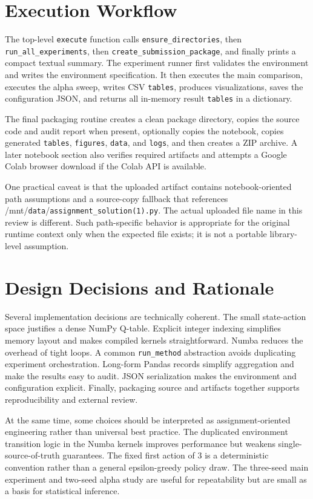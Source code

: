 \documentclass[11pt,a4paper]{article}
\begin{document}
\section{Execution Workflow}
The top-level \texttt{execute} function calls \texttt{ensure\_directories}, then \texttt{run\_all\_experiments}, then \texttt{create\_submission\_package}, and finally prints a compact textual summary. The experiment runner first validates the environment and writes the environment specification. It then executes the main comparison, executes the alpha sweep, writes CSV \texttt{tables}, produces visualizations, saves the configuration JSON, and returns all in-memory result \texttt{tables} in a dictionary.

The final packaging routine creates a clean package directory, copies the source code and audit report when present, optionally copies the notebook, copies generated \texttt{tables}, \texttt{figures}, \texttt{data}, and \texttt{logs}, and then creates a ZIP archive. A later notebook section also verifies required artifacts and attempts a Google Colab browser download if the Colab API is available.

One practical caveat is that the uploaded artifact contains notebook-oriented path assumptions and a source-copy fallback that references /mnt/\texttt{data}/\texttt{assignment\_solution(1).py}. The actual uploaded file name in this review is different. Such path-specific behavior is appropriate for the original runtime context only when the expected file exists; it is not a portable library-level assumption.

\section{Design Decisions and Rationale}
Several implementation decisions are technically coherent. The small state-action space justifies a dense NumPy Q-table. Explicit integer indexing simplifies memory layout and makes compiled kernels straightforward. Numba reduces the overhead of tight loops. A common \texttt{run\_method} abstraction avoids duplicating experiment orchestration. Long-form Pandas records simplify aggregation and make the results easy to audit. JSON serialization makes the environment and configuration explicit. Finally, packaging source and artifacts together supports reproducibility and external review.

At the same time, some choices should be interpreted as assignment-oriented engineering rather than universal best practice. The duplicated environment transition logic in the Numba kernels improves performance but weakens single-source-of-truth guarantees. The fixed first action of 3 is a deterministic convention rather than a general epsilon-greedy policy draw. The three-seed main experiment and two-seed alpha study are useful for repeatability but are small as a basis for statistical inference.
\end{document}
